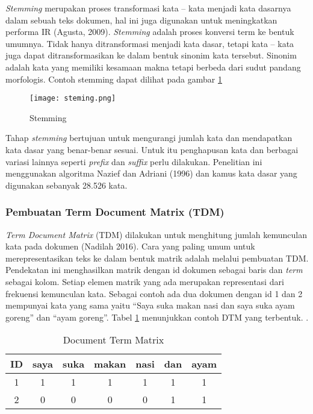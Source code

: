 \textit{Stemming} merupakan proses transformasi kata – kata menjadi kata dasarnya dalam sebuah teks dokumen, hal ini juga digunakan untuk meningkatkan performa IR (Agusta, 2009). \textit{Stemming} adalah  proses  konversi term ke  bentuk  umumnya. Tidak hanya ditransformasi menjadi kata dasar, tetapi kata – kata juga dapat ditransformasikan ke dalam bentuk sinonim kata tersebut. Sinonim adalah kata yang memiliki kesamaan makna tetapi berbeda dari sudut pandang morfologis. Contoh stemming dapat dilihat pada gambar \ref{fig:steming} 

\begin{figure}[h!] %
	\centering
	\texttt{[image: steming.png]}
	\caption{Stemming}
	\label{fig:steming}
\end{figure}

Tahap \textit{stemming} bertujuan untuk mengurangi jumlah kata dan mendapatkan kata dasar yang benar-benar sesuai. Untuk itu penghapusan kata dan berbagai variasi lainnya seperti \textit{prefix} dan \textit{suffix} perlu dilakukan. Penelitian ini menggunakan algoritma Nazief dan Adriani (1996) dan kamus kata dasar  yang digunakan sebanyak 28.526 kata.

\subsubsection*{Pembuatan Term Document Matrix (TDM)}

\textit{Term Document Matrix} (TDM) dilakukan untuk menghitung jumlah kemunculan kata pada dokumen (Nadilah 2016). Cara yang paling umum untuk merepresentasikan teks ke dalam bentuk matrik adalah melalui pembuatan TDM. Pendekatan ini menghasilkan matrik dengan id dokumen sebagai baris dan \textit{term} sebagai kolom. Setiap elemen matrik yang ada merupakan representasi dari frekuensi kemunculan kata.
Sebagai contoh ada dua dokumen dengan id 1 dan 2 mempunyai kata yang sama yaitu “Saya suka makan nasi dan saya suka ayam goreng” dan “ayam goreng”. Tabel \ref{tab:dtm} menunjukkan contoh DTM yang terbentuk.
.

\begin{table}[hbt]
	\caption{Document Term Matrix}
	\centering
	\begin{adjustbox}{max width=\textwidth}
		\begin{tabular}{*{7}{c}}%
			\toprule
			ID & saya & suka & makan & nasi & dan & ayam \\
			\midrule
			1 & 1 & 1 & 1 & 1 & 1 & 1 \\
			2 & 0 & 0 & 0 & 0 & 1 & 1 \\
			\bottomrule
		\end{tabular}
	\end{adjustbox}
	\label{tab:dtm}
\end{table}

